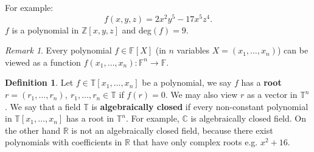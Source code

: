 \documentclass[thesis=M,english]{FITthesis}[2012/10/20]
\theoremstyle{remark}
\newtheorem*{RM}{Remark}
\theoremstyle{definition}
\newtheorem{DF}{Definition}[section]
\begin{document}
\noindent For example:
$$
f(x,y,z) = 2x^2y^5 - 17x^5z^4.
$$
$f$ is a polynomial in $\mathbb{Z}[x,y,z]$ and deg$(f)=9.$
\begin{RM}
Every polynomial $f \in \mathbb{F}[X]$ (in $n$ variables $X = (x_1,\ldots,x_n)$) can be viewed as a function $f(x_1,\ldots,x_n) : \mathbb{F}^n \to \mathbb{F}$.
\end{RM}
\begin{DF}
Let $f \in \mathbb{T}[x_1,\ldots,x_n]$ be a polynomial, we say $f$ has a \textbf{root} $r = (r_1, \ldots, r_n),\ r_1, \ldots, r_n \in \mathbb{T}$ if $f(r) = 0.$ We may also view $r$ as a vector in $\mathbb{T}^n$. We say that a field $\mathbb{T}$ is \textbf{algebraically closed} if every non-constant polynomial in $\mathbb{T}[x_1,\ldots,x_n]$ has a root in $\mathbb{T}^n$. For example, $\mathbb{C}$ is algebraically closed field. On the other hand $\mathbb{R}$ is not an algebraically  closed field, because there exist polynomials with coefficients in $\mathbb{R}$ that have only complex roots e.g. $x^2 + 16$.
\end{DF}
\end{document}

